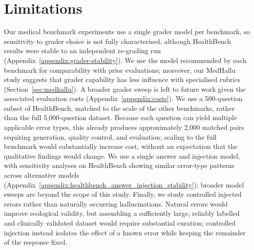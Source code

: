 \documentclass{article}
\newcommand{\fabio}[1]{\textcolor{FabioRose}{\textbf{[Fabio: #1]}}}
\begin{document}
 
\section*{Limitations}


Our medical benchmark experiments use a single grader model per benchmark, so sensitivity to grader choice is not fully characterised, although HealthBench results were stable to an independent re-grading run (Appendix~\ref{appendix:grader-stability}). We use the model recommended by each benchmark for comparability with prior evaluations; moreover, our MedHallu study suggests that grader capability has less influence with specialised rubrics (Section~\ref{sec:medhallu}). A broader grader sweep is left to future work given the associated evaluation costs (Appendix~\ref{appendix:costs}). We use a 500-question subset of HealthBench, matched to the scale of the other benchmarks, rather than the full 5,000-question dataset. Because each question can yield multiple applicable error types, this already produces approximately 2,000 matched pairs requiring generation, quality control, and evaluation; scaling to the full benchmark would substantially increase cost, without an expectation that the qualitative findings would change. We use a single answer and injection model, with sensitivity analyses on HealthBench showing similar error-type patterns across alternative models (Appendix~\ref{appendix:healthbench_answer_injection_stability}); broader model sweeps are beyond the scope of this study. Finally, we study controlled injected errors rather than naturally occurring hallucinations. Natural errors would improve ecological validity, but assembling a sufficiently large, reliably labelled and clinically validated dataset would require substantial curation; controlled injection instead isolates the effect of a known error while keeping the remainder of the response fixed.
\end{document}
